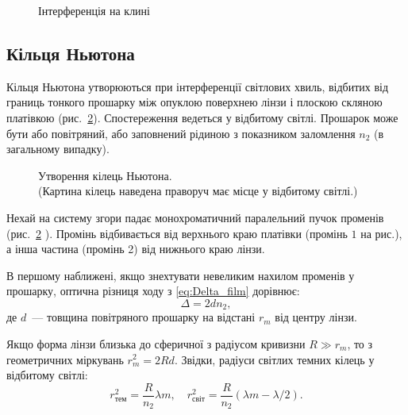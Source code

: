 \begin{figure}[h!]\centering
	
	\caption{Інтерференція на клині}
	\label{pic:klin_interference}
\end{figure}



\subsection*{Кільця Ньютона}


Кільця Ньютона утворюються при інтерференції світлових хвиль, відбитих від границь тонкого прошарку між опуклою поверхнею лінзи і плоскою скляною платівкою (рис.~\ref{pic:Newton_rings}). Спостереження ведеться у відбитому світлі. Прошарок може бути або повітряний, або заповнений рідиною з показником заломлення $n_2$ (в загальному випадку).

\begin{figure}[h!]\centering
	
	\caption{Утворення кілець Ньютона. \\ (Картина кілець наведена праворуч має місце у відбитому світлі.)}
	\label{pic:Newton_rings}
\end{figure}

Нехай на систему згори падає монохроматичний паралельний пучок променів (рис.~\ref{pic:Newton_rings} ). Промінь відбивається від верхнього краю платівки (промінь $1$ на рис.), а інша частина (промінь 2) від нижнього краю лінзи.

В першому наближені, якщо знехтувати невеликим нахилом променів у прошарку, оптична різниця ходу з \eqref{eq:Delta_film} дорівнює:
\begin{equation}
	\Delta =2dn_2,
\end{equation}
де $d$~--- товщина повітряного прошарку на відстані $r_m$ від центру лінзи.

Якщо форма лінзи близька до сферичної з радіусом кривизни $R \gg r_m$, то з геометричних міркувань $r^2_m = 2Rd $. Звідки, радіуси світлих темних кілець у відбитому світлі:
\begin{equation}
	\label{rdark}
	r_\text{тем}^2=\frac{R}{n_2}\lambda m, \quad r_\text{світ}^2=\frac{R}{n_2}(\lambda m-\lambda/2).
\end{equation}


